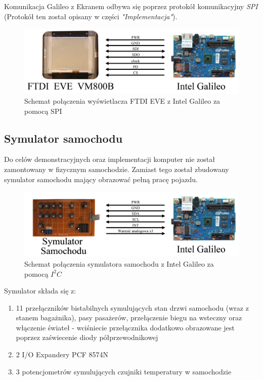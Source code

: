 \documentclass{xmgr}
\begin{document}
Komunikacja Galileo z Ekranem odbywa się poprzez protokół komunikacyjny \emph{SPI} (Protokół ten został opisany w części \emph{"Implementacja"}).

\begin{figure}[!h]
    \centering
    \includegraphics[height=0.24\textheight]{images/ekranGalileo.jpg}
    \caption{Schemat połączenia wyświetlacza FTDI EVE z Intel Galileo za pomocą SPI}
\end{figure}

\subsection{Symulator samochodu}
Do celów demonstracyjnych oraz implementacji komputer nie został zamontowany w fizycznym samochodzie. Zamiast tego został zbudowany symulator samochodu mający obrazować pełną pracę pojazdu.

\begin{figure}[!h]
    \centering
    \includegraphics[height=0.24\textheight]{images/symulatorGalileo.jpg}
    \caption{Schemat połączenia symulatora samochodu z Intel Galileo za pomocą $I^2C$}
\end{figure}

Symulator składa się z:
\begin{enumerate}
	\item 11 przełączników bistabilnych symulujących stan drzwi samochodu (wraz z stanem bagażnika), pasy pasażerów, przełączenie biegu na wsteczny oraz włączenie świateł - wciśniecie przełącznika dodatkowo obrazowane jest poprzez zaświecenie diody półprzewodnikowej
	\item 2 I/O Expandery PCF 8574N 
	\item 3 potencjometrów symulujących czujniki temperatury w samochodzie
\end{enumerate}
\end{document}
